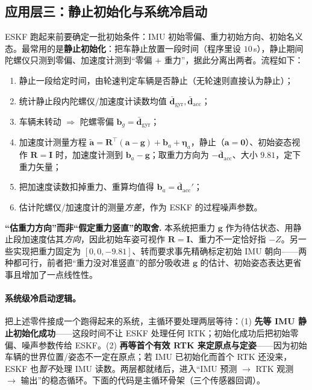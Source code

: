 \subsection{应用层三：静止初始化与系统冷启动}
\label{sec:gins-init}

ESKF 跑起来前要确定一批初始条件：IMU 初始零偏、重力初始方向、初始名义态。最常用的是\textbf{静止初始化}\cite{gao2023slamad}：把车静止放置一段时间（程序里设 $10$\,s），静止期间陀螺仪只测到零偏、加速度计测到“零偏 $+$ 重力”，据此分离出两者。流程如下：
\begin{enumerate}
  \item 静止一段给定时间，由轮速判定车辆是否静止（无轮速则直接认为静止）；
  \item 统计静止段内陀螺仪/加速度计读数均值 $\bar{\mathbf{d}}_{\text{gyr}},\bar{\mathbf{d}}_{\text{acc}}$；
  \item 车辆未转动 $\Rightarrow$ 陀螺零偏 $\mathbf{b}_g=\bar{\mathbf{d}}_{\text{gyr}}$；
  \item 加速度计测量方程 $\tilde{\mathbf{a}}=\mathbf{R}^\top(\mathbf{a}-\mathbf{g})+\mathbf{b}_a+\boldsymbol{\eta}_a$，静止（$\mathbf{a}=\mathbf{0}$）、初始姿态视作 $\mathbf{R}=\mathbf{I}$ 时，加速度计测到 $\mathbf{b}_a-\mathbf{g}$；取重力方向为 $-\bar{\mathbf{d}}_{\text{acc}}$、大小 $9.81$，定下重力矢量；
  \item 把加速度读数扣掉重力、重算均值得 $\mathbf{b}_a=\bar{\mathbf{d}}_{\text{acc}}'$；
  \item 估计陀螺仪/加速度计的测量\emph{方差}，作为 ESKF 的过程噪声参数。
\end{enumerate}

\begin{note}
\textbf{“估重力方向”而非“假定重力竖直”的取舍.}\;
本系统把重力 $\mathbf{g}$ 作为待估状态、用静止段加速度估其\emph{方向}，因此初始车姿可视作 $\mathbf{R}=\mathbf{I}$、重力不一定恰好指 $-Z$\cite{gao2023slamad}。另一些实现把重力固定为 $[0,0,-9.81]$、转而要求事先精确标定初始 IMU 朝向——两种都可行，前者把“重力没对准竖直”的部分吸收进 $\mathbf{g}$ 的估计、初始姿态表达更省事且增加了一点线性性。
\end{note}

\paragraph{系统级冷启动逻辑。}
把上述零件接成一个跑得起来的系统，主循环要处理两层等待\cite{gao2023slamad}：(1) \textbf{先等 IMU 静止初始化成功}——这段时间不让 ESKF 处理任何 RTK；初始化成功后把初始零偏、噪声参数传给 ESKF。(2) \textbf{再等首个有效 RTK 来定原点与定姿}——因为初始车辆的世界位置/姿态不一定在原点；若 IMU 已初始化而首个 RTK 还没来，ESKF 也\emph{暂不}处理 IMU 读数。两层都就绪后，进入“IMU 预测 $\to$ RTK 观测 $\to$ 输出”的稳态循环。下面的代码是主循环骨架（三个传感器回调）。

